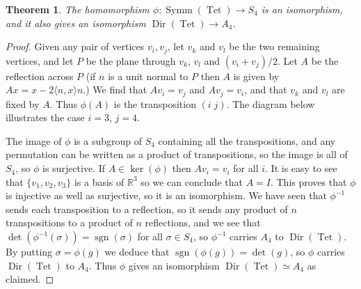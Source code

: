 \documentclass{amsart}
\DeclareMathOperator{\Tet}      {Tet}
\DeclareMathOperator{\Dir}      {Dir}
\DeclareMathOperator{\Symm}     {Symm}
\DeclareMathOperator{\sgn}      {sgn}
\newcommand{\R}         {{\mathbb{R}}}
\newcommand{\ip}[1]     {\langle #1\rangle}
\newcommand{\xra}       {\xrightarrow}
\newcommand{\blob}      {circle(0.03cm)}
\newcommand{\sg}        {\sigma}
\renewcommand{\:}{\colon}
\newtheorem{theorem}{Theorem}[section]
\theoremstyle{definition}
\begin{document}
\begin{theorem}
 The homomorphism $\phi\:\Symm(\Tet)\xra{}S_4$ is an isomorphism, and
 it also gives an isomorphism $\Dir(\Tet)\xra{}A_4$.
\end{theorem}
\begin{proof}
 Given any pair of vertices $v_i,v_j$, let $v_k$ and $v_l$ be the two
 remaining vertices, and let $P$ be the plane through $v_k$,
 $v_l$ and $(v_i+v_j)/2$.  Let $A$ be the reflection across $P$ (if
 $n$ is a unit normal to $P$ then $A$ is given by $Ax=x-2\ip{n,x}n$.)
 We find that $Av_i=v_j$ and $Av_j=v_i$, and that $v_k$ and $v_l$ are
 fixed by $A$.  Thus $\phi(A)$ is the transposition $(i\;j)$.  The
 diagram below illustrates the case $i=3$, $j=4$.
 \begin{center}
 \end{center}

 The image of $\phi$ is a subgroup of $S_4$ containing all the
 transpositions, and any permutation can be written as a product of
 transpositions, so the image is all of $S_4$, so $\phi$ is surjective.
 If $A\in\ker(\phi)$ then $Av_i=v_i$ for all $i$.  It is easy to see
 that $\{v_1,v_2,v_3\}$ is a basis of $\R^3$ so we can conclude that
 $A=I$.  This proves that $\phi$ is injective as well as surjective, so
 it is an isomorphism.  We have seen that $\phi^{-1}$ sends each
 transposition to a reflection, so it sends any product of $n$
 transpositions to a product of $n$ reflections, and we see that
 $\det(\phi^{-1}(\sg))=\sgn(\sg)$ for all $\sg\in S_4$, so $\phi^{-1}$
 carries $A_4$ to $\Dir(\Tet)$.  By putting $\sg=\phi(g)$ we deduce
 that $\sgn(\phi(g))=\det(g)$, so $\phi$ carries $\Dir(\Tet)$ to $A_4$.
 Thus $\phi$ gives an isomorphism $\Dir(\Tet)\simeq A_4$ as claimed.
\end{proof}
\end{document}
